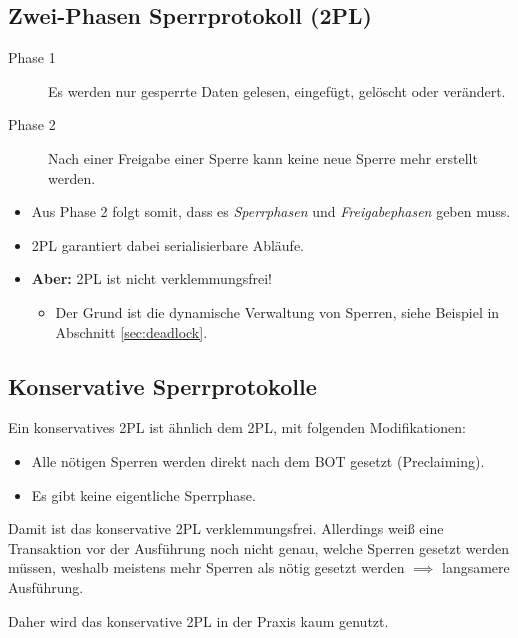         \subsection{Zwei-Phasen Sperrprotokoll (2PL)} %
            \begin{description}
            	\item[Phase 1] Es werden nur gesperrte Daten gelesen, eingefügt, gelöscht oder verändert.
            	\item[Phase 2] Nach einer Freigabe einer Sperre kann keine neue Sperre mehr erstellt werden.
            \end{description}
            \begin{itemize}
            	\item Aus Phase 2 folgt somit, dass es \textit{Sperrphasen} und \textit{Freigabephasen} geben muss.
            	\item 2PL garantiert dabei serialisierbare Abläufe.
            	\item \textbf{Aber:} 2PL ist nicht verklemmungsfrei!
            		\begin{itemize}
            			\item Der Grund ist die dynamische Verwaltung von Sperren, siehe Beispiel in Abschnitt \ref{sec:deadlock}.
            		\end{itemize}
            \end{itemize}

        \subsection{Konservative Sperrprotokolle} %
        	Ein konservatives 2PL ist ähnlich dem 2PL, mit folgenden Modifikationen:
            \begin{itemize}
            	\item Alle nötigen Sperren werden direkt nach dem BOT gesetzt (Preclaiming).
            	\item Es gibt keine eigentliche Sperrphase.
            \end{itemize}
        
        	Damit ist das konservative 2PL verklemmungsfrei. Allerdings weiß eine Transaktion vor der Ausführung noch nicht genau, welche Sperren gesetzt werden müssen, weshalb meistens mehr Sperren als nötig gesetzt werden \( \implies \) langsamere Ausführung.
        	
        	Daher wird das konservative 2PL in der Praxis kaum genutzt.

